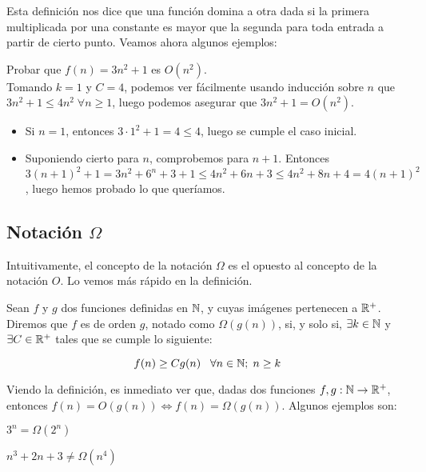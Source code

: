 Esta definición nos dice que una función domina a otra dada si la primera multiplicada por una constante es mayor que la segunda para toda entrada a partir de cierto punto. Veamos ahora algunos ejemplos:

\begin{ejemplo}
	Probar que $f(n) = 3n^2 + 1$ es $O(n^2)$.\\
	
	Tomando $k=1$ y $C=4$, podemos ver fácilmente usando inducción sobre $n$ que $3n^2 + 1 \leq 4n^2\;\forall n \geq 1$, luego podemos asegurar que $3n^2 + 1 = O(n^2)$.\\
	
	\begin{itemize}
		\item Si $n=1$, entonces $3 \cdot 1^2 + 1 = 4 \leq 4$, luego se cumple el caso inicial.
		\item Suponiendo cierto para $n$, comprobemos para $n + 1$. Entonces $3(n+1)^2 + 1 = 3n^2 + 6^n + 3 + 1 \leq 4n^2 + 6n + 3 \leq 4n^2 + 8n + 4 = 4(n+1)^2$, luego hemos probado lo que queríamos.
	\end{itemize}
\end{ejemplo}

\subsection{Notación $\Omega$}

Intuitivamente, el concepto de la notación $\Omega$ es el opuesto al concepto de la notación $O$. Lo vemos más rápido en la definición.

\begin{definicion}
	Sean $f$ y $g$ dos funciones definidas en $\mathbb{N}$, y cuyas imágenes pertenecen a $\mathbb{R}^+$. Diremos que $f$ es de orden $g$, notado como $\Omega(g(n))$, si, y solo si, $\exists k \in \mathbb{N}$ y $\exists C \in \mathbb{R}^+$ tales que se cumple lo siguiente:
	
	$$f(n) \geq Cg(n) \;\;\;\forall n \in \mathbb{N};\; n \geq k$$
\end{definicion}

Viendo la definición, es inmediato ver que, dadas dos funciones $f,g:\mathbb{N} \to \mathbb{R}^+$, entonces $f(n) = O(g(n)) \Leftrightarrow f(n) = \Omega(g(n))$. Algunos ejemplos son:

\begin{ejemplo}
	$3^n = \Omega(2^n)$
\end{ejemplo}

\begin{ejemplo}
	$n^3 + 2n + 3 \neq \Omega(n^4)$
\end{ejemplo}

